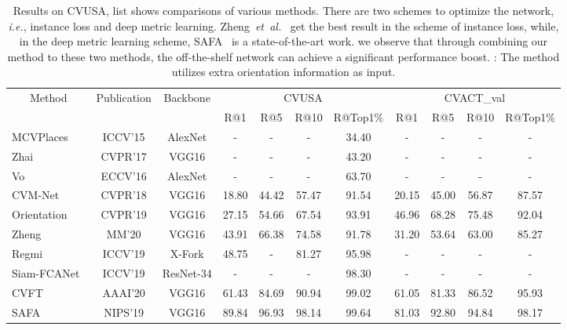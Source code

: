 \documentclass[journal]{IEEEtran}
\def\ie{\emph{i.e.}}
\def\etal{\emph{et~al.}}
\begin{document}
\begin{table*}[htp]
\setlength{\tabcolsep}{7pt}
\centering
\small
\caption{
Results on CVUSA, list shows comparisons of various methods. There are two schemes to optimize the network, \ie, instance loss and deep metric learning. Zheng~\etal~\cite{zheng_university-1652_nodate} get the best result in the scheme of instance loss, while, in the deep metric learning scheme, SAFA~\cite{shi_spatial-aware_nodate} is a state-of-the-art work. we observe that through combining our method to these two methods, the off-the-shelf network can achieve a significant performance boost. : The method utilizes extra orientation information as input.
}
\begin{tabular}{l|c|c|cccc|cccc}
\hline
\multicolumn{1}{c|}{\multirow{2}{*}{Method}} & \multirow{2}{*}{Publication} & \multirow{2}{*}{Backbone} & \multicolumn{4}{c|}{CVUSA} & \multicolumn{4}{c}{CVACT\_val}\\ 
\cline{4-11}
                                        & & & R@1 & R@5 & R@10 & R@Top1\% & R@1 & R@5 & R@10 & R@Top1\% \\
\shline
MCVPlaces~\cite{workman_wide-area_2015} & ICCV'15 & AlexNet & - & - & - & 34.40 & - & - & - & - \\
Zhai~\cite{zhai_predicting_2017} & CVPR'17 & VGG16 & - & - & - & 43.20 & - & - & - & -\\
Vo~\cite{vo_localizing_2017}    & ECCV'16 & AlexNet & - & - & - & 63.70 & - & - & - & -\\
CVM-Net~\cite{hu_cvm-net_2018} & CVPR'18 & VGG16 & 18.80 & 44.42 & 57.47 & 91.54 & 20.15 & 45.00 & 56.87 & 87.57\\
Orientation~\cite{liu_lending_2019}   & CVPR'19 & VGG16 & 27.15 & 54.66 & 67.54 & 93.91 & 46.96 & 68.28 & 75.48 & 92.04\\
Zheng~\cite{zheng_university-1652_nodate} & MM'20 & VGG16 & 43.91 & 66.38 & 74.58 & 91.78 & 31.20 & 53.64 & 63.00 & 85.27\\
Regmi~\cite{Regmi_2019_ICCV} & ICCV'19 & X-Fork & 48.75 & - & 81.27 & 95.98 & - & - & - & -\\
Siam-FCANet~\cite{Siam-FCANet} & ICCV'19 & ResNet-34 & - & - & - & 98.30 & - & - & - & -\\
CVFT~\cite{shi_optimal_nodate} & AAAI'20 & VGG16 & 61.43 & 84.69 & 90.94 & 99.02 & 61.05 & 81.33 & 86.52 & 95.93\\
SAFA~\cite{shi_spatial-aware_nodate} & NIPS'19 & VGG16 & 89.84 & 96.93 & 98.14 & 99.64 & 81.03 & 92.80 & 94.84 & 98.17\\
\hline

\end{tabular}
\end{table*}
\end{document}
